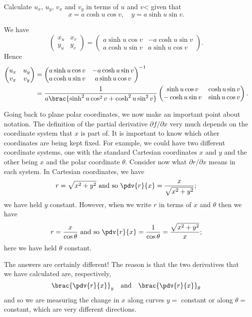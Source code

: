 \begin{exercise}
Calculate $u_x$, $u_y$, $v_x$ and $v_y$ in terms of $u$ and $v$< given that
\[x=a\cosh u\cos v,\quad y=a\sinh u\sin v.\]
\end{exercise}

\begin{solution}
We have
\[\begin{pmatrix}
x_u&x_v\\
y_u&y_v
\end{pmatrix}=
\begin{pmatrix}
a\sinh u\cos v&-a\cosh u\sin v\\
a\cosh u\sin v&a\sinh u\cos v
\end{pmatrix}.\]
Hence
\begin{align*}
\begin{pmatrix}
u_x&u_y\\
v_x&v_y
\end{pmatrix}&=
\begin{pmatrix}
a\sinh u\cos v&-a\cosh u\sin v\\
a\cosh u\sin v&a\sinh u\cos v
\end{pmatrix}^{-1}\\
&=\frac{1}{a\brac{\sinh^2u\cos^2v+\cosh^2u\sin^2v}}\begin{pmatrix}
\sinh u\cos v&\cosh u\sin v\\
-\cosh u\sin v&\sinh u\cos v
\end{pmatrix}.
\end{align*}
\end{solution}

Going back to plane polar coordinates, we now make an important point about notation. The definition of the partial derivative $\partial f/\partial x$ very much depends on the coordinate system that $x$ is part of. It is important to know which other coordinates are being kept fixed. For example, we could have two different coordinate systems, one with the standard Cartesian coordinates $x$ and $y$ and the other being $x$ and the polar coordinate $\theta$. Consider now what $\partial r/\partial x$ means in each system. In Cartesian coordinates, we have
\[r=\sqrt{x^2+y^2}\text{ and so }\pdv{r}{x}=\frac{x}{\sqrt{x^2+y^2}};\]
we have held $y$ constant. However, when we write $r$ in terms of $x$ and $\theta$ then we have
\[r=\frac{x}{\cos\theta}\text{ and so }\pdv{r}{x}=\frac{1}{\cos\theta}=\frac{\sqrt{x^2+y^2}}{x};\]
here we have held $\theta$ constant.

The answers are certainly different! The reason is that the two derivatives that we have calculated are, respectively,
\[\brac{\pdv{r}{x}}_y\quad\text{and}\quad\brac{\pdv{r}{x}}_\theta\]
and so we are measuring the change in $x$ along curves $y=$ constant or along $\theta=$ constant, which are very different directions.

